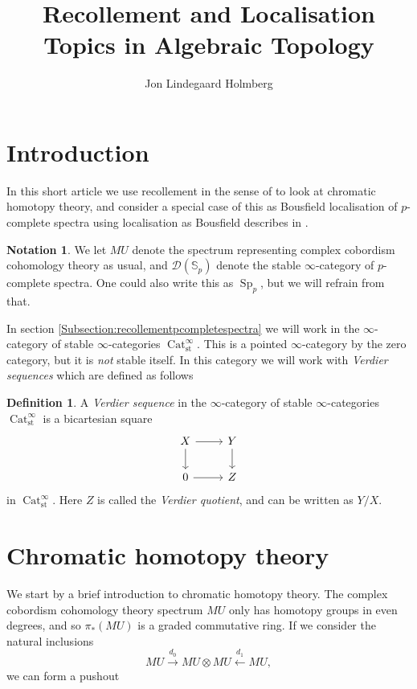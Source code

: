 \documentclass[a4paper]{article} %
\author{Jon Lindegaard Holmberg}
\title{Recollement and Localisation\\Topics in Algebraic Topology}
\theoremstyle{definition}
\newtheorem{definition}[theorem]{Definition}
\newtheorem{notation}{Notation}
\newcommand{\Sph}{\mathbb{S}}
\DeclareMathOperator{\Cat}{Cat}         %
\begin{document}
\maketitle

\tableofcontents

\section{Introduction}
In this short article we use recollement in the sense of \cite{barwickglasman} to look at chromatic homotopy theory, and consider a special case of this as Bousfield localisation of $p$-complete spectra using localisation as Bousfield describes in \cite{bousfield1979localization}.
\begin{notation}
  We let $MU$ denote the spectrum representing complex cobordism cohomology theory as usual, and $\mathcal{D} (\Sph_p)$ denote the stable $\infty$-category of $p$-complete spectra. One could also write this as $\operatorname{Sp}_p$, but we will refrain from that.
\end{notation}
In section \ref{Subsection:recollementpcompletespectra} we will work in the $\infty$-category of stable $\infty$-categories $\Cat_{\text{st}}^\infty$. This is a pointed $\infty$-category by the zero category, but it is \textit{not} stable itself. In this category we will work with \textit{Verdier sequences} which are defined as follows

\begin{definition}
  A \textit{Verdier sequence} in the $\infty$-category of stable $\infty$-categories $\Cat_{\text{st}}^\infty$ is a bicartesian square
  \[
    \begin{tikzcd}
      X \arrow{r}{} \arrow{d}{} & Y \arrow{d}{} \\
       0 \arrow{r}{} & Z
    \end{tikzcd}
  \]
  in $\Cat_{\text{st}}^\infty$. Here $Z$ is called the \textit{Verdier quotient}, and can be written as $Y/X$.
\end{definition}

\section{Chromatic homotopy theory}

We start by a brief introduction to chromatic homotopy theory. The complex cobordism cohomology theory spectrum $MU$ only has homotopy groups in even degrees, and so $\pi_*(MU)$ is a graded commutative ring. If we consider the natural inclusions $$MU \overset{d_0}{\to} MU \otimes MU \overset{d_1}{\leftarrow} MU,$$ we can form a pushout
\end{document}
